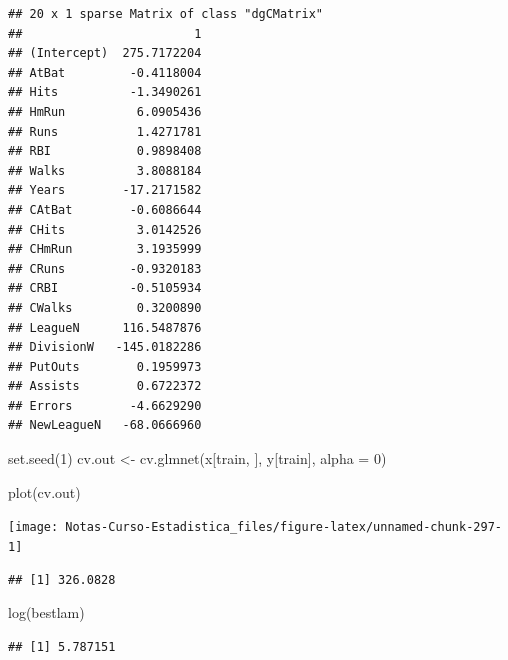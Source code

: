 \documentclass[
  12pt,
]{book}
\newenvironment{Shaded}{\begin{snugshade}}{\end{snugshade}}
\newcommand{\AttributeTok}[1]{\textcolor[rgb]{0.77,0.63,0.00}{#1}}
\newcommand{\DecValTok}[1]{\textcolor[rgb]{0.00,0.00,0.81}{#1}}
\newcommand{\FunctionTok}[1]{\textcolor[rgb]{0.00,0.00,0.00}{#1}}
\newcommand{\NormalTok}[1]{#1}
\newcommand{\OtherTok}[1]{\textcolor[rgb]{0.56,0.35,0.01}{#1}}
\newcommand{\SpecialCharTok}[1]{\textcolor[rgb]{0.00,0.00,0.00}{#1}}
\theoremstyle{definition}
\theoremstyle{definition}
\theoremstyle{definition}
\theoremstyle{remark}
\begin{document}
\begin{verbatim}
## 20 x 1 sparse Matrix of class "dgCMatrix"
##                        1
## (Intercept)  275.7172204
## AtBat         -0.4118004
## Hits          -1.3490261
## HmRun          6.0905436
## Runs           1.4271781
## RBI            0.9898408
## Walks          3.8088184
## Years        -17.2171582
## CAtBat        -0.6086644
## CHits          3.0142526
## CHmRun         3.1935999
## CRuns         -0.9320183
## CRBI          -0.5105934
## CWalks         0.3200890
## LeagueN      116.5487876
## DivisionW   -145.0182286
## PutOuts        0.1959973
## Assists        0.6722372
## Errors        -4.6629290
## NewLeagueN   -68.0666960
\end{verbatim}

\begin{Shaded}
\begin{Highlighting}[]
\FunctionTok{set.seed}\NormalTok{(}\DecValTok{1}\NormalTok{)}
\NormalTok{cv.out }\OtherTok{\textless{}{-}} \FunctionTok{cv.glmnet}\NormalTok{(x[train, ], y[train], }\AttributeTok{alpha =} \DecValTok{0}\NormalTok{)}

\FunctionTok{plot}\NormalTok{(cv.out)}
\end{Highlighting}
\end{Shaded}

\begin{center}\texttt{[image: Notas-Curso-Estadistica\_files/figure-latex/unnamed-chunk-297-1]} \end{center}

\begin{Shaded}
\end{Shaded}

\begin{verbatim}
## [1] 326.0828
\end{verbatim}

\begin{Shaded}
\begin{Highlighting}[]
\FunctionTok{log}\NormalTok{(bestlam)}
\end{Highlighting}
\end{Shaded}

\begin{verbatim}
## [1] 5.787151
\end{verbatim}
\end{document}
